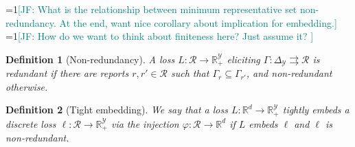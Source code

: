 \documentclass[12pt]{article}
\newcommand{\Comments}{1}
\newcommand{\mynote}[2]{\ifnum\Comments=1\textcolor{#1}{#2}\fi}
\newcommand{\jessie}[1]{\mynote{teal}{[JF: #1]}}
\newcommand{\reals}{\mathbb{R}}
\newcommand{\prop}[1]{\mathrm{prop}[#1]}
\newcommand{\simplex}{\Delta_\Y}
\newcommand{\R}{\mathcal{R}}
\newcommand{\Sc}{\mathcal{S}}
\newcommand{\Y}{\mathcal{Y}}
\newcommand{\toto}{\rightrightarrows}
\newcommand{\trim}{\mathrm{trim}}
\newtheorem{definition}{Definition}
\begin{document}


\jessie{What is the relationship between minimum representative set non-redundancy.  At the end, want nice corollary about implication for embedding.}
\jessie{How do we want to think about finiteness here? Just assume it? }

\begin{definition}[Non-redundancy]\label{def:nonredundant}
  A loss $L : \R \to \reals^\Y_+$ eliciting $\Gamma:\simplex \toto \R$ is \emph{redundant} if there are reports $r, r' \in \R$ such that $\Gamma_r \subseteq \Gamma_{r'}$, and \emph{non-redundant} otherwise.
\end{definition}

\begin{definition}[Tight embedding]\label{def:tight-embedding}
  We say that a loss $L : \reals^d \to \reals_+^\Y$ \emph{tightly embeds} a discrete loss $\ell : \R \to \reals_+^\Y$ via the injection $\varphi :\R \to \reals^d$ if $L$ embeds $\ell$ and $\ell$ is non-redundant.
\end{definition}
\end{document}
